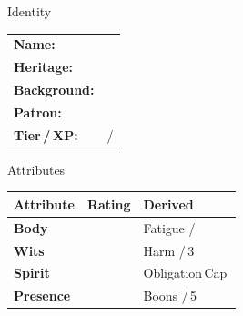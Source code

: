 \documentclass[10pt]{article}
\begin{document}
\begin{minipage}[t]{0.48\linewidth}
    \begin{charbox}{Identity}
        \begin{tabular}{p{2.5cm} p{5cm}}
            \textbf{Name:} & \underline{\hspace{4cm}}\\
            \textbf{Heritage:} & \underline{\hspace{4cm}}\\
            \textbf{Background:} & \underline{\hspace{4cm}}\\
            \textbf{Patron:} & \underline{\hspace{4cm}}\\
            \textbf{Tier / XP:} & \underline{\hspace{2cm}} / \underline{\hspace{2cm}}\\
        \end{tabular}
    \end{charbox}
    
    \vspace{0.5em}
    
    \begin{charbox}{Attributes}
        \begin{tabular}{>{\bfseries}p{2.5cm} >{\bfseries}p{1.5cm} p{2.5cm}}
            \toprule
            \textbf{Attribute} & \textbf{Rating} & \textbf{Derived}\\
            \midrule
            Body & \underline{\hspace{1.5cm}} & Fatigue \underline{\hspace{1.5cm}} / \underline{\hspace{1.5cm}}\\
            Wits & \underline{\hspace{1.5cm}} & Harm \underline{\hspace{1.5cm}} / 3\\
            Spirit & \underline{\hspace{1.5cm}} & Obligation Cap \underline{\hspace{1.5cm}}\\
            Presence & \underline{\hspace{1.5cm}} & Boons \underline{\hspace{1.5cm}} / 5\\
            \bottomrule
        \end{tabular}
    \end{charbox}
    

\end{minipage}
\end{document}
